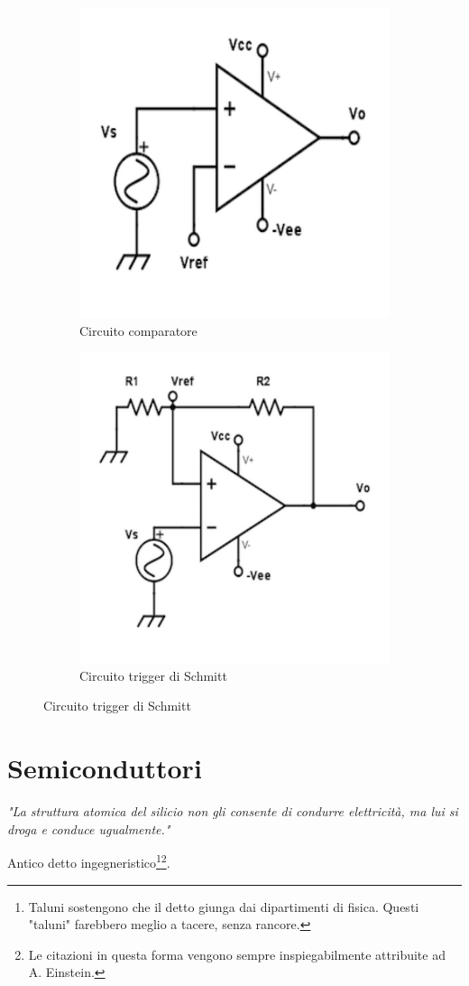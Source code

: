 \documentclass[a4paper,portrait,12pt]{article}
\theoremstyle{definition}
\begin{document}
\begin{figure}[H]
\begin{subfigure}{.5\textwidth}
\centering
\includegraphics[width=.5\linewidth]{img/comparatore.pdf}
\caption{Circuito comparatore}
\label{fig:comparatore}
\end{subfigure}
\begin{subfigure}{.5\textwidth}
\centering
\includegraphics[width=.5\linewidth]{img/triggerschmitt.pdf}
\caption{Circuito trigger di Schmitt}
\label{fig:triggerschmitt}
\end{subfigure}
\end{figure}

\section{Semiconduttori}
\begin{center}
\textit{"La struttura atomica del silicio non gli consente di condurre elettricità, ma lui si droga e 
conduce ugualmente."} 
\end{center}
\hfill Antico detto ingegneristico\footnote{Taluni sostengono che il detto giunga 
dai dipartimenti di fisica. Questi "taluni" farebbero meglio a tacere, senza rancore.}\footnote{Le 
citazioni in questa forma vengono sempre inspiegabilmente attribuite ad A. Einstein.}.
\bigskip
\end{document}

